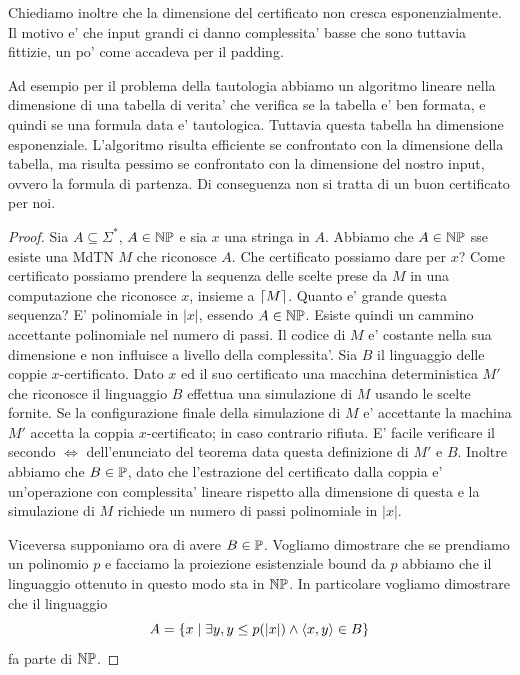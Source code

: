 Chiediamo inoltre che la dimensione del certificato non cresca esponenzialmente. Il motivo e' che
input grandi ci danno complessita' basse che sono tuttavia fittizie, un po' come accadeva per il
padding.

Ad esempio per il problema della tautologia abbiamo un algoritmo lineare nella dimensione di una
tabella di verita' che verifica se la tabella e' ben formata, e quindi se una formula data e'
tautologica. Tuttavia questa tabella ha dimensione esponenziale. L'algoritmo risulta efficiente se
confrontato con la dimensione della tabella, ma risulta pessimo se confrontato con la dimensione del
nostro input, ovvero la formula di partenza. Di conseguenza non si tratta di un buon certificato per
noi.

\begin{proof}

    Sia $A \subseteq \Sigma^{*}$, $A \in \mathbb{NP}$ e sia $x$ una stringa in $A$. Abbiamo che $A \in
    \mathbb{NP}$ sse esiste una MdTN $M$ che riconosce $A$. Che certificato possiamo dare per $x$?
    Come certificato possiamo prendere la sequenza delle scelte prese da $M$ in una computazione che
    riconosce $x$, insieme a $\lceil M \rceil$. Quanto e' grande questa sequenza? E' polinomiale in $|x|$,
    essendo $A \in \mathbb{NP}$. Esiste quindi un cammino accettante polinomiale nel numero di passi.
    Il codice di $M$ e' costante nella sua dimensione e non influisce a livello della complessita'.
    Sia $B$ il linguaggio delle coppie $x$-certificato. Dato $x$ ed il suo certificato una macchina
    deterministica $M'$ che riconosce il linguaggio $B$ effettua una simulazione di $M$ usando le scelte
    fornite. Se la configurazione finale della simulazione di $M$ e' accettante la machina $M'$
    accetta la coppia $x$-certificato; in caso contrario rifiuta. E' facile verificare il secondo $\iff$
    dell'enunciato del teorema data questa definizione di $M'$ e $B$. Inoltre abbiamo che $B \in
    \mathbb{P}$, dato che l'estrazione del certificato dalla coppia e' un'operazione con complessita'
    lineare rispetto alla dimensione di questa e la simulazione di $M$ richiede un numero di passi
    polinomiale in $|x|$.

    Viceversa supponiamo ora di avere $B \in \mathbb{P}$. Vogliamo dimostrare che se prendiamo un
    polinomio $p$ e facciamo la proiezione esistenziale bound da $p$ abbiamo che il linguaggio
    ottenuto in questo modo sta in $\mathbb{NP}$. In particolare vogliamo dimostrare che il linguaggio
    \begin{equation*}
        A = \{x \mid \exists y, y \leq p(|x|) \land \langle x, y \rangle \in B\}
    \end{equation*}
    fa parte di $\mathbb{NP}$.


\end{proof}

